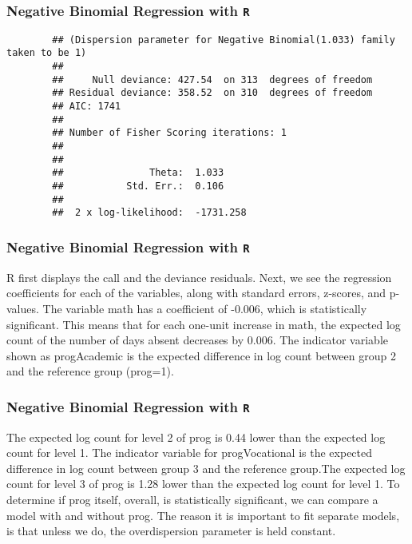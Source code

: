 \documentclass[00-GLMregslides.tex]{subfiles}
\begin{document}
\begin{frame}[fragile]
	\frametitle{Negative Binomial Regression with \texttt{R} }
	\Large
	\begin{framed}
		\begin{verbatim}
		## (Dispersion parameter for Negative Binomial(1.033) family taken to be 1)
		## 
		##     Null deviance: 427.54  on 313  degrees of freedom
		## Residual deviance: 358.52  on 310  degrees of freedom
		## AIC: 1741
		## 
		## Number of Fisher Scoring iterations: 1
		## 
		## 
		##               Theta:  1.033 
		##           Std. Err.:  0.106 
		## 
		##  2 x log-likelihood:  -1731.258
		\end{verbatim}
	\end{framed}
	
	
\end{frame}
\begin{frame}[fragile]
	\frametitle{Negative Binomial Regression with \texttt{R} }
	\Large
	
	R first displays the call and the deviance residuals. Next, we see the regression coefficients for each of the variables, along with standard errors, z-scores, and p-values. The variable math has a coefficient of -0.006, which is statistically significant. This means that for each one-unit increase in math, the expected log count of the number of days absent decreases by 0.006. The indicator variable shown as progAcademic is the expected difference in log count between group 2 and the reference group (prog=1). 
	
\end{frame}
\begin{frame}[fragile]
	\frametitle{Negative Binomial Regression with \texttt{R} }
	\Large
	
	The expected log count for level 2 of prog is 0.44 lower than the expected log count for level 1. The indicator variable for progVocational is the expected difference in log count between group 3 and the reference group.The expected log count for level 3 of prog is 1.28 lower than the expected log count for level 1. To determine if prog itself, overall, is statistically significant, we can compare a model with and without prog. The reason it is important to fit separate models, is that unless we do, the overdispersion parameter is held constant.
\end{frame}
\end{document}
